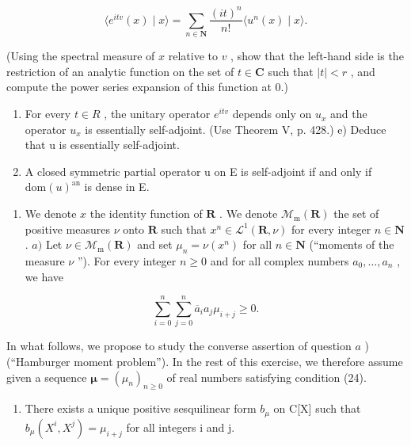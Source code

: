 \[
\langle e ^ {i t v} (x) \mid x \rangle = \sum_ {n \in \mathbf {N}} \frac {(i t) ^ {n}}{n !} \langle u ^ {n} (x) \mid x \rangle .
\]

(Using the spectral measure of \(x\) relative to \(v\) , show that the left-hand side is the restriction of an analytic function on the set of \(t \in \mathbf{C}\) such that \(|t| < r\) , and compute the power series expansion of this function at 0.)

\begin{enumerate}
\def\labelenumi{\alph{enumi})}
\setcounter{enumi}{3}
\item
  For every \(t \in R\) , the unitary operator \(e^{itv}\) depends only on \(u_x\) and the operator \(u_x\) is essentially self-adjoint. (Use Theorem V, p. 428.) e) Deduce that u is essentially self-adjoint.
\item
  A closed symmetric partial operator u on E is self-adjoint if and only if \(\text{dom}(u)^{\text{an}}\) is dense in E.
\end{enumerate}

\begin{enumerate}
\def\labelenumi{\arabic{enumi})}
\setcounter{enumi}{20}
\tightlist
\item
  We denote \(x\) the identity function of \(\mathbf{R}\) . We denote \(\mathcal{M}_{\mathrm{m}}(\mathbf{R})\) the set of positive measures \(\nu\) onto \(\mathbf{R}\) such that \(x^n \in \mathcal{L}^1(\mathbf{R}, \nu)\) for every integer \(n \in \mathbf{N}\) . \(a)\) Let \(\nu \in \mathcal{M}_{\mathrm{m}}(\mathbf{R})\) and set \(\mu_n = \nu(x^n)\) for all \(n \in \mathbf{N}\) (“moments of the measure \(\nu\) ”). For every integer \(n \geqslant 0\) and for all complex numbers \(a_0, \ldots, a_n\) , we have
\end{enumerate}

\[
\sum_ {i = 0} ^ {n} \sum_ {j = 0} ^ {n} \overline {{a}} _ {i} a _ {j} \mu_ {i + j} \geqslant 0.\tag{24}
\]

In what follows, we propose to study the converse assertion of question \(a\) ) (“Hamburger moment problem”). In the rest of this exercise, we therefore assume given a sequence \(\boldsymbol{\mu} = (\mu_n)_{n \geqslant 0}\) of real numbers satisfying condition (24).

\begin{enumerate}
\def\labelenumi{\alph{enumi})}
\setcounter{enumi}{1}
\tightlist
\item
  There exists a unique positive sesquilinear form \(b_{\mu}\) on C{[}X{]} such that \(b_{\mu}(X^{i}, X^{j}) = \mu_{i+j}\) for all integers i and j.
\end{enumerate}

